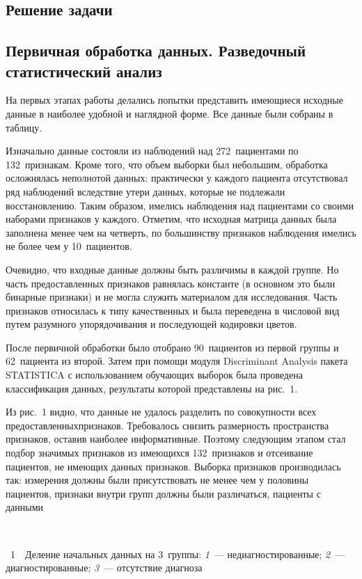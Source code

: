 \begin{multicols}{2}
\section{Решение задачи}

\subsection{Первичная обработка данных. Разведочный статистический анализ}

На первых этапах работы делались попытки представить имеющиеся
исходные данные в наиболее удобной и наглядной форме. Все данные были собраны в таблицу.

Изначально данные состояли из наблюдений над 272~пациентами по 132~признакам. 
Кроме того, что объем выборки был небольшим, обработка
осложнялась неполнотой данных: практически у каждого пациента
отсутствовал ряд наблюдений вследствие утери данных, которые не
подлежали восстановлению. Таким образом, имелись наблюдения над
пациентами со своими наборами признаков у каждого. Отметим, что
исходная матрица данных была заполнена менее чем на четверть, по
большинству признаков наблюдения имелись не более чем у 10~пациентов.

Очевидно, что входные данные должны быть различимы в каждой группе.
Но часть пред\-остав\-лен\-ных признаков равнялась константе (в основном
это были бинарные признаки) и не могла \mbox{служить} материалом для
исследования. Часть признаков относилась к типу качественных и была
переведена в числовой вид путем разумного упорядочивания и последующей кодировки цветов.

После первичной обработки было отобрано 90~пациентов из первой
группы и 62~пациента из второй. Затем при помощи модуля Discriminant
Analysis пакета STATISTICA с использованием обучающих выборок была
проведена классификация данных, результаты которой представлены на
рис.~1.


Из рис.~1 видно, что данные не удалось раз\-делить по совокупности
всех предоставленных\linebreak признаков. Требовалось снизить размерность
пространства признаков, оставив наиболее информативные. Поэтому
следующим этапом стал подбор значимых
 признаков из имеющихся 
132~признаков и отсеивание пациентов, не имеющих данных признаков.
Выборка признаков производилась так: измерения должны были
присутствовать не менее чем
 у половины пациентов, признаки внутри
групп должны были различаться, пациенты с данными\linebreak\vspace*{-12pt}
\begin{center}  %
\vspace*{9pt}
\mbox{%
 \epsfxsize=64.413mm
 }
  \end{center}
{{\figurename~1}\ \ \small{Деление начальных данных на 3~группы:
   \textit{1}~--- недиагностированные;
   \textit{2}~--- диагностированные;
   \textit{3}~--- отсутствие диагноза}}



\end{multicols}
